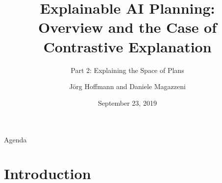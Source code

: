 \newcommand{\images}{../IMAGES}
\graphicspath{{../IMAGES/}}




\title[Explainable AI Planning]{Explainable AI Planning:\\ Overview and the Case of Contrastive Explanation}

\subtitle{Part 2: Explaining the Space of Plans}

\author[Hoffmann and Magazzeni]{J\"org Hoffmann and Daniele Magazzeni}


\date{September 23, 2019}





\frame{\titlepage}

\begin{frame}{Agenda}
\tableofcontents
\end{frame}



%

\section[Introduction]{Introduction}
